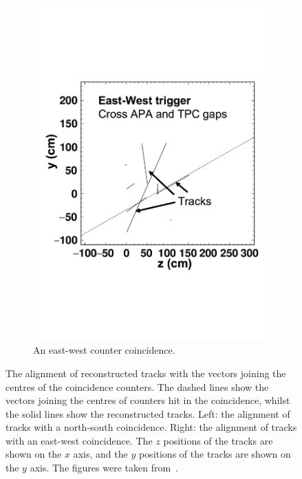 \begin{figure}
\begin{subfigure}{0.48\textwidth}
    \includegraphics[width=\textwidth]{east-west}
    \caption{An east-west counter coincidence.}
    \label{fig:CounterTrackAngle_EW}
  \end{subfigure}
  \caption[The alignment of reconstructed tracks with the vectors joining the centres of the coincidence counters]
          {The alignment of reconstructed tracks with the vectors joining the centres of the coincidence counters. The dashed lines show the vectors joining the centres of counters hit in the coincidence, whilst the solid lines show the reconstructed tracks. Left: the alignment of tracks with a north-south coincidence. Right: the alignment of tracks with an east-west coincidence. The $z$ positions of the tracks are shown on the $x$ axis, and the $y$ positions of the tracks are shown on the $y$ axis. The figures were taken from~\citep{TingjunClustering}.}
          \label{fig:CounterTrackAngle}
\end{figure}

